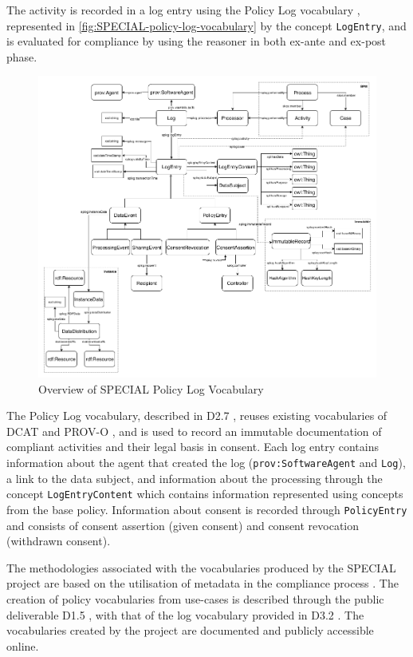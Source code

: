 The activity is recorded in a log entry using the Policy Log vocabulary \cite{bonatti_special_2018-1}, represented in \autoref{fig:SPECIAL-policy-log-vocabulary} by the concept \texttt{LogEntry}, and is evaluated for compliance by using the reasoner in both ex-ante and ex-post phase. 
\begin{figure}[htbp]
    \centering
    \includegraphics[width=0.8\linewidth]{img/SPECIAL_logvocabulary.png}
    \caption{Overview of SPECIAL Policy Log Vocabulary \cite{bonatti_special_2018-1}}
    \label{fig:SPECIAL-policy-log-vocabulary}
\end{figure}

The Policy Log vocabulary, described in D2.7 \cite{kirrane_d2.7_2018}, reuses existing vocabularies of DCAT and PROV-O \cite{lebo_prov-o_2013}, and is used to record an immutable documentation of compliant activities and their legal basis in consent. Each log entry contains information about the agent that created the log (\texttt{prov:SoftwareAgent} and \texttt{Log}), a link to the data subject, and information about the processing through the concept \texttt{LogEntryContent} which contains information represented using concepts from the base policy.
Information about consent is recorded through \texttt{PolicyEntry} and consists of consent assertion (given consent) and consent revocation (withdrawn consent).

The methodologies associated with the vocabularies produced by the SPECIAL project are based on the utilisation of metadata in the compliance process \cite{wenning_compliance_2018}. The creation of policy vocabularies from use-cases is described through the public deliverable D1.5 \cite{bonatti_d1.5_2018}, with that of the log vocabulary provided in D3.2 \cite{kirrane_d2.7_2018}. The vocabularies created by the project are documented and publicly accessible online.

